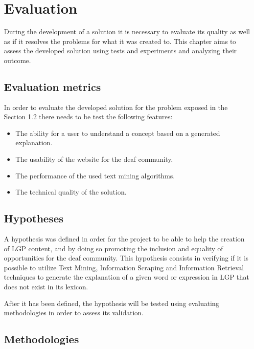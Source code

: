 
\chapter{Evaluation} %
\label{chap:Chapter6}

During the development of a solution it is necessary to evaluate its quality as well as if it resolves the problems for what it was created to.
This chapter aims to assess the developed solution using tests and experiments and analyzing their outcome.

\section{Evaluation metrics}

In order to evaluate the developed solution for the problem exposed in the Section 1.2 there needs to be test the following features:

\begin{itemize}
    \item The ability for a user to understand a concept based on a generated explanation.
    \item The usability of the website for the deaf community.
    \item The performance of the used text mining algorithms.
    \item The technical quality of the solution.
\end{itemize}

\section{Hypotheses}

A hypothesis was defined in order for the project to be able to help the creation of \gls{LGP} content, and by doing so promoting the inclusion and equality of opportunities for the deaf community.
This hypothesis consists in verifying if it is possible to utilize  Text Mining\cite{gupta2009survey}, Information Scraping\cite{young2006method}\cite{rose2017automatically} and Information Retrieval\cite{baeza1999modern} techniques to generate the explanation of a given word or expression in \gls{LGP} that does not exist in its lexicon.


After it has been defined, the hypothesis will be tested using evaluating methodologies in order to assess its validation.

\section{Methodologies}

